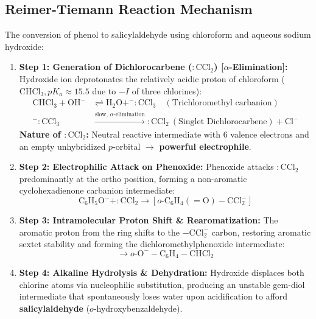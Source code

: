 \documentclass[10pt,a4paper]{article}
\begin{document}
\subsection{Reimer-Tiemann Reaction Mechanism}

\begin{conceptbox}
The conversion of phenol to salicylaldehyde using chloroform and aqueous sodium hydroxide:
\begin{enumerate}[leftmargin=*]
  \item \textbf{Step 1: Generation of Dichlorocarbene ($:\mathrm{CCl_2}$) [$\alpha$-Elimination]:}
  Hydroxide ion deprotonates the relatively acidic proton of chloroform ($\mathrm{CHCl_3}, pK_a \approx 15.5$ due to $-I$ of three chlorines):
  \begin{align*}
    \mathrm{CHCl_3} + \mathrm{OH^-} &\rightleftharpoons \mathrm{H_2O} + ^-:\mathrm{CCl_3} \quad (\text{Trichloromethyl carbanion})\\
    ^-:\mathrm{CCl_3} &\xrightarrow{\text{slow, }\alpha\text{-elimination}} \mathbf{:\mathrm{CCl_2}} \ (\text{Singlet Dichlorocarbene}) + \mathrm{Cl^-}
  \end{align*}
  \textbf{Nature of $:\mathrm{CCl_2}$:} Neutral reactive intermediate with 6 valence electrons and an empty unhybridized $p$-orbital $\to$ \textbf{powerful electrophile}.
  \item \textbf{Step 2: Electrophilic Attack on Phenoxide:}
  Phenoxide attacks $:\mathrm{CCl_2}$ predominantly at the ortho position, forming a non-aromatic cyclohexadienone carbanion intermediate:
  \begin{equation}
    \mathrm{C_6H_5O^-} + :\mathrm{CCl_2} \to [o\text{-}\mathrm{C_6H_4(=O)-CCl_2^-}]
  \end{equation}
  \item \textbf{Step 3: Intramolecular Proton Shift \& Rearomatization:}
  The aromatic proton from the ring shifts to the $-\mathrm{CCl_2^-}$ carbon, restoring aromatic sextet stability and forming the dichloromethylphenoxide intermediate:
  \begin{equation}
    [o\text{-}\mathrm{C_6H_4(=O)-CCl_2^-}] \to o\text{-}\mathrm{O^--C_6H_4-CHCl_2}
  \end{equation}
  \item \textbf{Step 4: Alkaline Hydrolysis \& Dehydration:}
  Hydroxide displaces both chlorine atoms via nucleophilic substitution, producing an unstable gem-diol intermediate that spontaneously loses water upon acidification to afford \textbf{salicylaldehyde} ($o$-hydroxybenzaldehyde).
\end{enumerate}
\end{conceptbox}
\end{document}
